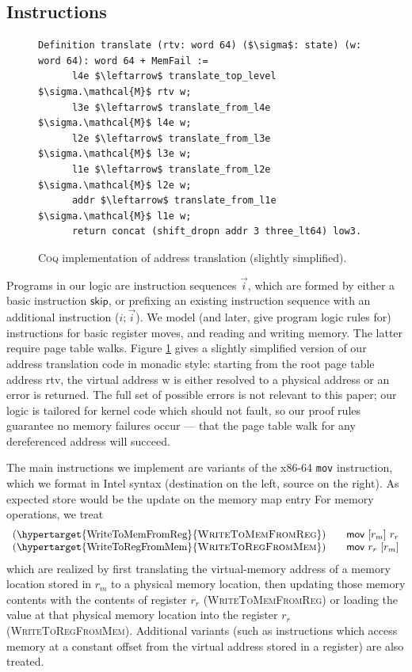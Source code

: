 \documentclass[acmsmall,screen,nonacm]{acmart}
\renewcommand{\TirNameStyle}[1]{\hypertarget{#1}{\textsc{#1}}}
\newcommand{\kw}[1]{\mathsf{#1}}
\newcommand{\instr}{i}
\newcommand{\instrs}{\ensuremath{\vec\instr}}
\newcommand{\iskip}{\ensuremath{\kw{skip}}}
\newcommand{\iseq}[2]{\ensuremath{#1; #2}}
\newcommand{\coq}{\textsc{Coq}\xspace}
\begin{document}
\subsection{Instructions}
\label{sec:instructions}

\begin{figure}[t]
\begin{lstlisting}[language=Coq,mathescape]
 Definition translate (rtv: word 64) ($\sigma$: state) (w: word 64): word 64 + MemFail :=
      l4e $\leftarrow$ translate_top_level $\sigma.\mathcal{M}$ rtv w; 
      l3e $\leftarrow$ translate_from_l4e $\sigma.\mathcal{M}$ l4e w; 
      l2e $\leftarrow$ translate_from_l3e $\sigma.\mathcal{M}$ l3e w;
      l1e $\leftarrow$ translate_from_l2e $\sigma.\mathcal{M}$ l2e w;
      addr $\leftarrow$ translate_from_l1e $\sigma.\mathcal{M}$ l1e w;
      return concat (shift_dropn addr 3 three_lt64) low3.
\end{lstlisting}
\vspace{-1em}
\caption{\coq implementation of address translation (slightly simplified).}
\label{fig:coq_addr_translation}
\end{figure}

Programs in our logic are instruction sequences \instrs, which are formed by either a basic instruction \iskip, or prefixing an existing instruction
sequence with an additional instruction (\iseq\instr\instrs).
We model (and later, give program logic rules for) instructions for basic register moves, and reading and writing memory.
The latter require page table walks.
Figure \ref{fig:coq_addr_translation} gives a slightly simplified version of our address translation code in monadic style:
starting from the root page table address \textsf{rtv}, the virtual address \textsf{w} is either resolved to a physical address or an error is returned.
The full set of possible errors is not relevant to this paper; our logic is tailored for kernel code which should not fault,
so our proof rules guarantee no memory failures occur --- that the page table walk for any dereferenced address will succeed.

%
%
%
%
%

The main instructions we implement are variants of the x86-64 \lstinline|mov| instruction, which we format in Intel syntax (destination on the left, source on the right).
As expected \textsf{store} would be the update on the memory map entry
%
For memory operations, we treat
\[
\begin{array}{l}
  \hbox{(\TirNameStyle{WriteToMemFromReg})} \qquad
  \textsf{mov}~[r_m]~r_r \\
  \hbox{(\TirNameStyle{WriteToRegFromMem})} \qquad 
  \textsf{mov}~r_r~[r_m]
  \end{array}
  \]
which are realized by first translating the virtual-memory address of a memory location stored in $r_m$ to a physical memory location,
then updating those memory contents with the contents of register $r_r$ (\TirNameStyle{WriteToMemFromReg}) 
or loading the value at that physical memory location into the register $r_r$
(\TirNameStyle{WriteToRegFromMem}). 
%
Additional variants (such as instructions which access memory at a constant offset from the virtual address stored in a register) are also treated.
\end{document}
